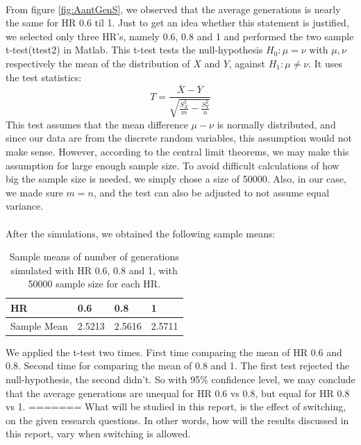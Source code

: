 \\
From figure \ref{fig:AantGenS}, we observed that the average generations is nearly the same for HR 0.6 til 1. Just to get an idea whether this statement is justified, we selected only three HR's, namely 0.6, 0.8 and 1 and performed the two sample t-test(ttest2) in Matlab. This t-test tests the null-hypothesis $H_0:\mu=\nu$ with $\mu,\nu$ respectively the mean of the distribution of $X$ and $Y$, against $H_1:\mu\neq\nu$. It uses the test statistics:
 \[T=\frac{\overline{X}-\overline{Y}}{\sqrt{\frac{S^2_X}{m}-\frac{S^2_Y}{n}}}\]
This test assumes that the mean difference $\mu-\nu$ is normally distributed, and since our data are from the discrete random variables, this assumption would not make sense. However, according to the central limit theorems, we may make this assumption for large enough sample size. To avoid difficult calculations of how big the sample size is needed, we simply chose a size of 50000. Also, in our case, we made sure $m=n$, and the test can also be adjusted to not assume equal variance.\\
\\
After the simulations, we obtained the following sample means:
\begin{table}[htp]
\centering
\caption{Sample means of number of generations simulated with HR 0.6, 0.8 and 1, with 50000 sample size for each HR.}
\begin{tabular}{|l|l|l|l|}
\hline
 HR&0.6&0.8&1 \\ \hline
 Sample Mean&2.5213&2.5616&2.5711  \\ \hline 
\end{tabular}
\end{table}
We applied the t-test two times. First time comparing the mean of HR 0.6 and 0.8. Second time for comparing the mean of 0.8 and 1. The first test rejected the null-hypothesis, the second didn't. So with 95\% confidence level, we may conclude that the average generations are unequal for HR 0.6 vs 0.8, but equal for HR 0.8 vs 1.
=======
What will be studied in this report, is the effect of switching, on the given research questions. In other words, how will the results discussed in this report, vary when switching is allowed. 
\newpage

